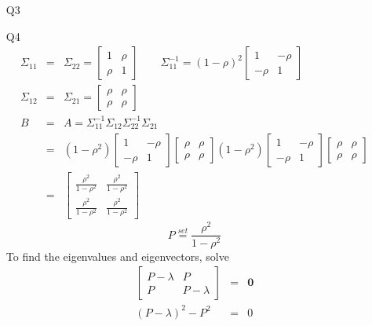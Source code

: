 \documentclass{article}
\begin{document}
\begin{itemize}
\item[Q3]
\item[Q4]
\begin{eqnarray*}
\Sigma_{11} & = & \Sigma_{22} = \begin{bmatrix}
1 & \rho \\
\rho & 1
\end{bmatrix} \qquad \Sigma_{11}^{-1} = (1- \rho)^2 \begin{bmatrix}
1 & -\rho \\
-\rho & 1
\end{bmatrix} \\
\Sigma_{12} & = & \Sigma_{21} = \begin{bmatrix}
\rho & \rho \\
\rho & \rho
\end{bmatrix} \\
B & = & A = \Sigma_{11}^{-1}\Sigma_{12}\Sigma_{22}^{-1}\Sigma_{21} \\
& = & (1 - \rho^2)\begin{bmatrix}
1 & -\rho \\
-\rho & 1
\end{bmatrix} \begin{bmatrix}
\rho & \rho \\
\rho & \rho
\end{bmatrix}  (1 - \rho^2)\begin{bmatrix}
1 & -\rho \\
-\rho & 1
\end{bmatrix} \begin{bmatrix}
\rho & \rho \\
\rho & \rho
\end{bmatrix}\\
& = & \begin{bmatrix}
\frac{\rho^2}{1 - \rho^2} & \frac{\rho^2}{1 - \rho^2} \\
\frac{\rho^2}{1 - \rho^2} & \frac{\rho^2}{1 - \rho^2}
\end{bmatrix}
\end{eqnarray*}
\begin{equation*}
P \overset{set}{=} \frac{\rho^2}{1 - \rho^2}
\end{equation*}
To find the eigenvalues and eigenvectors, solve
\begin{eqnarray*}
\begin{bmatrix}
P - \lambda & P \\
P & P - \lambda
\end{bmatrix} & = & \mathbf{0} \\
(P - \lambda)^2 - P^2 & = & 0\\

\end{eqnarray*}
\end{itemize}
\end{document}
